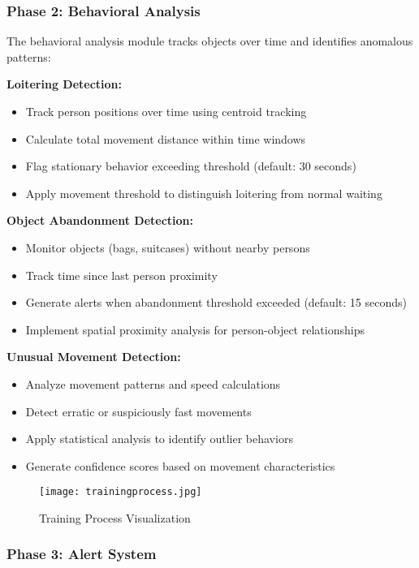 \documentclass[12pt,a4paper]{article}
\begin{document}
\subsubsection{Phase 2: Behavioral Analysis}

The behavioral analysis module tracks objects over time and identifies anomalous patterns:

\textbf{Loitering Detection:}
\begin{itemize}
    \item Track person positions over time using centroid tracking
    \item Calculate total movement distance within time windows
    \item Flag stationary behavior exceeding threshold (default: 30 seconds)
    \item Apply movement threshold to distinguish loitering from normal waiting
\end{itemize}

\textbf{Object Abandonment Detection:}
\begin{itemize}
    \item Monitor objects (bags, suitcases) without nearby persons
    \item Track time since last person proximity
    \item Generate alerts when abandonment threshold exceeded (default: 15 seconds)
    \item Implement spatial proximity analysis for person-object relationships
\end{itemize}

\textbf{Unusual Movement Detection:}
\begin{itemize}
    \item Analyze movement patterns and speed calculations
    \item Detect erratic or suspiciously fast movements
    \item Apply statistical analysis to identify outlier behaviors
    \item Generate confidence scores based on movement characteristics
\end{itemize}

\begin{figure}[H]
    \centering
    \texttt{[image: trainingprocess.jpg]}
    \caption{Training Process Visualization}
    \label{fig:training}
\end{figure}

\subsubsection{Phase 3: Alert System}
\end{document}
